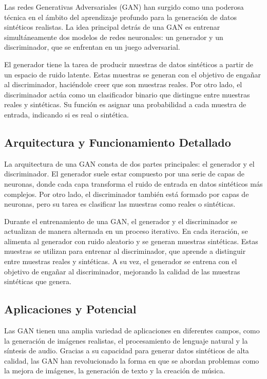 Las redes Generativas Adversariales (GAN) han surgido como una poderosa técnica en el ámbito del aprendizaje profundo para la generación de datos sintéticos realistas. La idea principal detrás de una GAN es entrenar simultáneamente dos modelos de redes neuronales: un generador y un discriminador, que se enfrentan en un juego adversarial.

El generador tiene la tarea de producir muestras de datos sintéticos a partir de un espacio de ruido latente. Estas muestras se generan con el objetivo de engañar al discriminador, haciéndole creer que son muestras reales. Por otro lado, el discriminador actúa como un clasificador binario que distingue entre muestras reales y sintéticas. Su función es asignar una probabilidad a cada muestra de entrada, indicando si es real o sintética.

\subsection{Arquitectura y Funcionamiento Detallado}

La arquitectura de una GAN consta de dos partes principales: el generador y el discriminador. El generador suele estar compuesto por una serie de capas de neuronas, donde cada capa transforma el ruido de entrada en datos sintéticos más complejos. Por otro lado, el discriminador también está formado por capas de neuronas, pero su tarea es clasificar las muestras como reales o sintéticas.

Durante el entrenamiento de una GAN, el generador y el discriminador se actualizan de manera alternada en un proceso iterativo. En cada iteración, se alimenta al generador con ruido aleatorio y se generan muestras sintéticas. Estas muestras se utilizan para entrenar al discriminador, que aprende a distinguir entre muestras reales y sintéticas. A su vez, el generador se entrena con el objetivo de engañar al discriminador, mejorando la calidad de las muestras sintéticas que genera.

\subsection{Aplicaciones y Potencial}

Las GAN tienen una amplia variedad de aplicaciones en diferentes campos, como la generación de imágenes realistas, el procesamiento de lenguaje natural y la síntesis de audio. Gracias a su capacidad para generar datos sintéticos de alta calidad, las GAN han revolucionado la forma en que se abordan problemas como la mejora de imágenes, la generación de texto y la creación de música.

